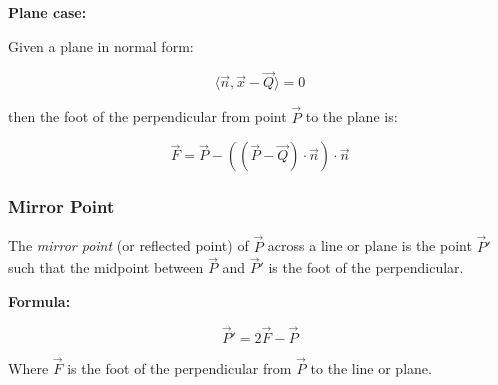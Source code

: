 \textbf{Plane case:}

Given a plane in normal form:

\[
	\langle \vec{n}, \vec{x} - \vec{Q} \rangle = 0
\]

then the foot of the perpendicular from point \(\vec{P}\) to the plane is:

\[
	\vec{F} = \vec{P} - ((\vec{P} - \vec{Q}) \cdot \vec{n}) \cdot \vec{n}
\]

\subsubsection{Mirror Point}

The \emph{mirror point} (or reflected point) of \(\vec{P}\) across a line or plane is the point \(\vec{P}'\) such that the midpoint between \(\vec{P}\) and \(\vec{P}'\) is the foot of the perpendicular.

\textbf{Formula:}

\[
	\vec{P}' = 2\vec{F} - \vec{P}
\]

Where \(\vec{F}\) is the foot of the perpendicular from \(\vec{P}\) to the line or plane.
